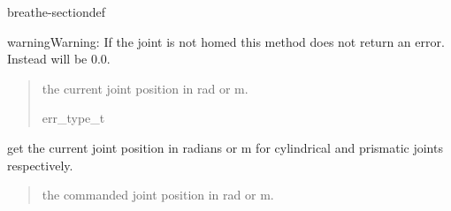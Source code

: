 \documentclass[letterpaper,10pt,english]{sphinxmanual}
\begin{document}
\begin{fulllineitems}
\begin{sphinxuseclass}{breathe-sectiondef}
\begin{fulllineitems}
\begin{sphinxadmonition}{warning}{Warning:}
\sphinxAtStartPar
If the joint is not homed this method does not return an error. Instead  will be 0.0.
\end{sphinxadmonition}
\begin{quote}\begin{description}
\sphinxAtStartPar
{} \textendash{} the current joint position in rad or m. 

\sphinxAtStartPar
err\_type\_t 

\end{description}\end{quote}

\end{fulllineitems}


\begin{fulllineitems}
\label{\detokenize{code/bioscara_hardware_drivers/index:_CPPv4N25bioscara_hardware_drivers25bioscara_hardware_drivers9BaseJoint11setPositionEf}}\label{\detokenize{code/bioscara_hardware_drivers/index:_CPPv3N25bioscara_hardware_drivers25bioscara_hardware_drivers9BaseJoint11setPositionEf}}\label{\detokenize{code/bioscara_hardware_drivers/index:_CPPv2N25bioscara_hardware_drivers25bioscara_hardware_drivers9BaseJoint11setPositionEf}}\label{\detokenize{code/bioscara_hardware_drivers/index:bioscara_hardware_drivers::bioscara_hardware_drivers::BaseJoint::setPosition__float}}
\pysigstartsignatures
\pysigstartmultiline
\pysiglinewithargsret
{\label{\detokenize{code/bioscara_hardware_drivers/index:classbioscara__hardware__drivers_1_1BaseJoint_1ac16fc6fc228f1e4855ed0401a2c8368e}}}
{}
{}
\pysigstopmultiline
\pysigstopsignatures
\sphinxAtStartPar
get the current joint position in radians or m for cylindrical and prismatic joints respectively. 
\begin{quote}\begin{description}
\sphinxAtStartPar
{} \textendash{} the commanded joint position in rad or m. 


\end{description}
\end{quote}
\end{fulllineitems}
\end{sphinxuseclass}
\end{fulllineitems}
\end{document}
